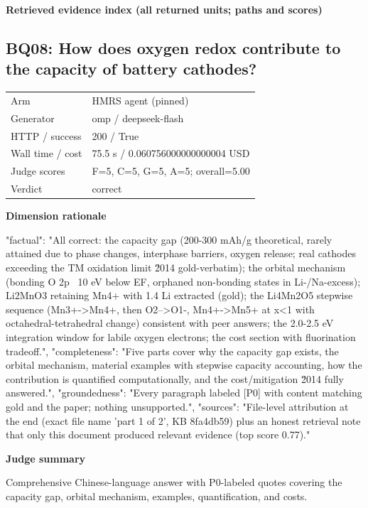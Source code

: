 \documentclass[10pt]{article}
\begin{document}
\textbf{Retrieved evidence index (all returned units; paths and scores) }
\begin{EvidenceText}
\end{EvidenceText}
\subsection{BQ08: How does oxygen redox contribute to the capacity of battery cathodes?}
\begin{tabular}{@{}ll@{}}
Arm & HMRS agent (pinned)\\
Generator & omp / deepseek-flash\\
HTTP / success & 200 / True\\
Wall time / cost & 75.5 s / 0.060756000000000004 USD\\
Judge scores & F=5, C=5, G=5, A=5; overall=5.00\\
Verdict & correct\\
\end{tabular}

\textbf{Dimension rationale}
\begin{EvidenceText}
{
  "factual": "All correct: the capacity gap (200-300 mAh/g theoretical, rarely attained due to phase changes, interphase barriers, oxygen release; real cathodes exceeding the TM oxidation limit \u2014 gold-verbatim); the orbital mechanism (bonding O 2p ~10 eV below EF, orphaned non-bonding states in Li-/Na-excess); Li2MnO3 retaining Mn4+ with 1.4 Li extracted (gold); the Li4Mn2O5 stepwise sequence (Mn3+->Mn4+, then O2-->O1-, Mn4+->Mn5+ at x<1 with octahedral-tetrahedral change) consistent with peer answers; the 2.0-2.5 eV integration window for labile oxygen electrons; the cost section with fluorination tradeoff.",
  "completeness": "Five parts cover why the capacity gap exists, the orbital mechanism, material examples with stepwise capacity accounting, how the contribution is quantified computationally, and the cost/mitigation \u2014 fully answered.",
  "groundedness": "Every paragraph labeled [P0] with content matching gold and the paper; nothing unsupported.",
  "sources": "File-level attribution at the end (exact file name 'part 1 of 2', KB 8fa4db59) plus an honest retrieval note that only this document produced relevant evidence (top score 0.77)."
}
\end{EvidenceText}

\textbf{Judge summary}
\begin{EvidenceText}
Comprehensive Chinese-language answer with P0-labeled quotes covering the capacity gap, orbital mechanism, examples, quantification, and costs.
\end{EvidenceText}
\end{document}
